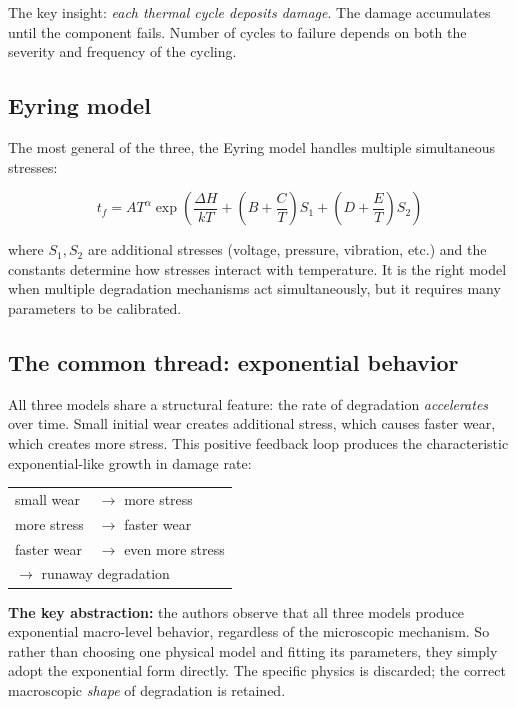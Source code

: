 \documentclass[11pt, a4paper]{article}
\begin{document}
The key insight: \emph{each thermal cycle deposits damage}. The
damage accumulates until the component fails. Number of cycles to
failure depends on both the severity and frequency of the cycling.

\subsection{Eyring model}

The most general of the three, the Eyring model handles multiple
simultaneous stresses:

\begin{equation}
  t_f = A T^{\alpha} \exp\!\left(
    \frac{\Delta H}{kT}
    + \left(B + \frac{C}{T}\right)S_1
    + \left(D + \frac{E}{T}\right)S_2
  \right)
  \label{eq:eyring}
\end{equation}

where $S_1, S_2$ are additional stresses (voltage, pressure, vibration,
etc.) and the constants determine how stresses interact with temperature.
It is the right model when multiple degradation mechanisms act
simultaneously, but it requires many parameters to be calibrated.

\subsection{The common thread: exponential behavior}

All three models share a structural feature: the rate of degradation
\emph{accelerates} over time. Small initial wear creates additional
stress, which causes faster wear, which creates more stress. This
positive feedback loop produces the characteristic exponential-like
growth in damage rate:

\begin{center}
\begin{tabular}{@{}ll@{}}
  small wear & $\to$ more stress \\
  more stress & $\to$ faster wear \\
  faster wear & $\to$ even more stress \\
  \multicolumn{2}{l}{$\to$ runaway degradation} \\
\end{tabular}
\end{center}

\begin{insightbox}
\textbf{The key abstraction:} the authors observe that all three models
produce exponential macro-level behavior, regardless of the microscopic
mechanism. So rather than choosing one physical model and fitting its
parameters, they simply adopt the exponential form directly. The specific
physics is discarded; the correct macroscopic \emph{shape} of degradation
is retained.
\end{insightbox}
\end{document}
